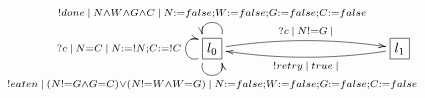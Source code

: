 $\xymatrix{
   \fbox{$l_0$} \ar@(ld,lu)[]^{?c\:|\:N=C\:|\:N:=!N;C:=!C} \ar@(dl,dr)[]_{!eaten\:|\:(N!=G\land G=C)\lor (N!=W\land W=G)\:|\:N:=false;W:=false;G:=false;C:=false} \ar@(ur,ul)[]_{!done\:|\:N\land W\land G\land C\:|\:N:=false;W:=false;G:=false;C:=false} \ar@/^/[rrrr]^{?c\:|\:N!=G\:|} &&&& \fbox{$l_1$} \ar@/^/[llll]^{!retry\:|\:true\:|}
}$
